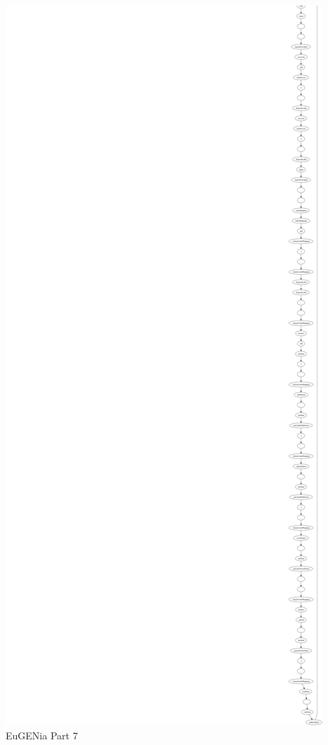 \begin{minipage}[b]{\textwidth}
\centering
\includegraphics[height=0.97\textheight]{./figures/eug_9.png}
EuGENia Part 7
\end{minipage}
